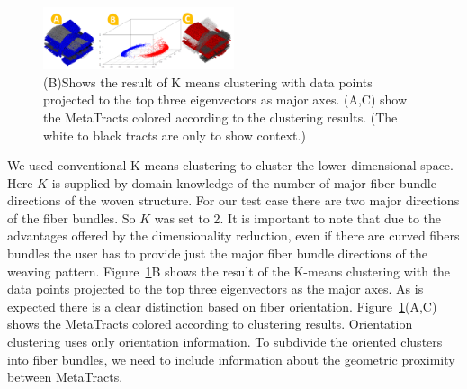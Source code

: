   
  \begin{figure}
  \centering
%  	
 \includegraphics[width=0.5\textwidth]{imagesMT2014/crop-16/Capture4.PNG}
  	\caption{(B)Shows the result of K means clustering with data points projected to the top three eigenvectors as major axes. (A,C) show the MetaTracts colored according to the clustering results. (The white to black tracts are only to show context.)  }
  \label{fig:orientation_clustering}
  \end{figure}
  
   We used conventional K-means clustering to cluster the lower dimensional space. Here $K$ is supplied by domain knowledge of the number of major fiber bundle directions of the woven structure.
For our test case there are two major directions of the fiber bundles. So $K$ was set to 2. It is important to note that due to the advantages offered by the dimensionality reduction, even if there are curved fibers bundles the user has to provide just the major fiber bundle directions of the weaving pattern. Figure~\ref{fig:orientation_clustering}B shows the result of the K-means clustering with the data points projected to the top three eigenvectors as the major axes. As is expected there is a clear distinction based on fiber orientation. Figure~\ref{fig:orientation_clustering}(A,C) shows the MetaTracts colored according to clustering results.
Orientation clustering uses only orientation information. To subdivide the oriented clusters into fiber bundles,
we need to include information about the geometric proximity between MetaTracts.


